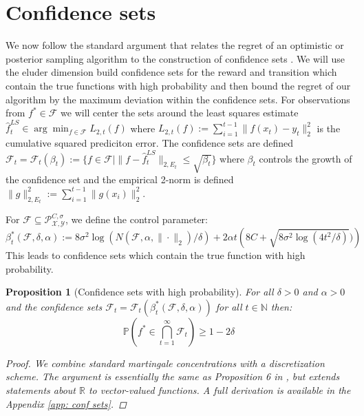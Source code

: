 \documentclass{article}
\newtheorem{prop}{Proposition}
\newcommand{\Prob}{\mathds{P}}
\newcommand{\Real}{\mathds{R}}
\newcommand{\Nat}{\mathbb{N}}
\newcommand{\Xc}{\mathcal{X}}
\newcommand{\Yc}{\mathcal{Y}}
\newcommand{\Pc}{\mathcal{P}}
\newcommand{\Fc}{\mathcal{F}}
\begin{document}
\section{Confidence sets}
\label{sec: conf}
We now follow the standard argument that relates the regret of an optimistic or posterior sampling algorithm to the construction of confidence sets \cite{jaksch2010near,osband2013more}.
We will use the eluder dimension build confidence sets for the reward and transition which contain the true functions with high probability and then bound the regret of our algorithm by the maximum deviation within the confidence sets.
For observations from $f^* \in \Fc$ we will center the sets around the least squares estimate $\hat{f}_t^{LS} \in \arg \min_{f \in \Fc} L_{2,t}(f)$ where $L_{2,t}(f) := \sum_{i=1}^{t-1} \|f(x_t) - y_t \|^2_2$ is the cumulative squared prediciton error.
The confidence sets are defined $\Fc_t = \Fc_t(\beta_t) := \{ f \in \Fc | \| f-\hat{f}_t^{LS} \|_{2,E_t} \le \sqrt{\beta_t} \}$ where $\beta_t$ controls the growth of the confidence set and the empirical 2-norm is defined $\|g\|_{2,E_t}^2 := \sum_{i=1}^{t-1} \|g(x_i)\|_2^2$.

For $\Fc \subseteq \Pc^{C,\sigma}_{\Xc,\Yc}$, we define the control parameter:
\begin{equation}
\label{eq: beta star}
	\beta^*_t(\Fc,\delta,\alpha) := 8 \sigma^2 \log(N(\Fc,\alpha,\|\cdot\|_2)/\delta) +
	2 \alpha t \left(8C + \sqrt{8\sigma^2 \log(4t^2/\delta)}) \right)
\end{equation}
This leads to confidence sets which contain the true function with high probability.

\begin{prop}[Confidence sets with high probability]
\label{prop: conf sets} \hspace{0.00000000000001mm} \newline
For all $\delta>0$ and $\alpha >0$ and the confidence sets $\Fc_t = \Fc_t(\beta^*_t(\Fc,\delta,\alpha))$ for all $t \in \Nat$ then:
$$\Prob \left( f^* \in \bigcap_{t=1}^\infty \Fc_t \right) \ge 1-2\delta $$
\begin{proof}
We combine standard martingale concentrations with a discretization scheme.
The argument is essentially the same as Proposition 6 in \cite{russo2013}, but extends statements about $\Real$ to vector-valued functions.
A full derivation is available in the Appendix \ref{app: conf sets}.
\end{proof}
\end{prop}
\end{document}
